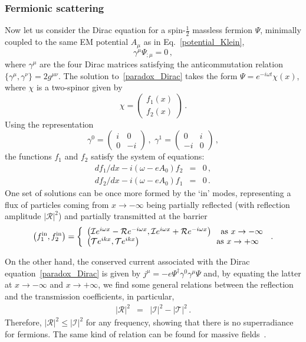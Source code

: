\documentclass[11pt]{article}
\newcommand{\be}{\begin{equation}}
\newcommand{\ee}{\end{equation}}
\newcommand{\bea}{\begin{eqnarray}}
\newcommand{\eea}{\end{eqnarray}}
\newcommand{\nn}{\nonumber}
\numberwithin{equation}{section} %
\begin{document}
\subsubsection{Fermionic scattering}
Now let us consider the Dirac equation for a spin-$\frac{1}{2}$ massless fermion $\Psi$, minimally coupled to the same 
EM potential $A_{\mu}$ as in Eq.~\eqref{potential_Klein},
%
\be\label{paradox_Dirac}
\gamma^{\mu}\Psi_{;\mu}=0\,,
\ee
%
where $\gamma^{\mu}$ are the four Dirac matrices satisfying the anticommutation relation $\{\gamma^{\mu},\gamma^{\nu}\}=2g^{\mu\nu}$. 
The solution to~\eqref{paradox_Dirac} takes the form $\Psi=e^{-i\omega t}\chi(x)$, where $\chi$ is a two-spinor given by
%
\be
\chi=\begin{pmatrix}f_1(x)\\f_2(x)\end{pmatrix}\,.
\ee
%
Using the representation
%
\be\label{rep}
\gamma^0=\begin{pmatrix}i&0\\0&-i\end{pmatrix}\,,\,\,\gamma^1=\begin{pmatrix}0&i\\-i&0\end{pmatrix}\,,
\ee
%
the functions $f_1$ and $f_2$ satisfy the system of equations:
%
\bea
df_1/dx-i(\omega-eA_0)f_2&=&0\,,\nn\\
df_2/dx-i(\omega-eA_0)f_1&=&0\,.
\eea
%
One set of solutions can be once more formed by the `in' modes, representing a flux of particles coming from $x\to-\infty$ being partially reflected (with reflection amplitude $|\mathcal{R}|^2$) and partially transmitted at the barrier
%
\bea\label{sol_fermion1}
\left(f_1^{\rm in},f_2^{\rm in}\right)=\left\{\begin{array}{l}
                                               \left(\mathcal{I}e^{i\omega x}-\mathcal{R} e^{-i\omega x},\mathcal{I} e^{i\omega x}+\mathcal{R} e^{-i\omega x}\right) \quad \text{as} \,\, x\to-\infty\\
                                               \left(\mathcal{T}e^{ikx},\mathcal{T}e^{ikx}\right) \quad \hspace{2.9cm} \text{as}\,\, x\to+\infty\
                                              \end{array}\right.\,.
\eea
%

On the other hand, the conserved current associated with the Dirac equation~\eqref{paradox_Dirac} is given by
$j^{\mu}=-e\Psi^{\dagger}\gamma^{0}\gamma^{\mu}\Psi$ and, by equating the latter at $x\to-\infty$ and $x\to+\infty$, we find some general relations between the reflection and the transmission coefficients, in particular, 
%
\bea\label{reflection_fermion}
\left|\mathcal{R}\right|^2&=&|\mathcal{I}|^2-\left|\mathcal{T}\right|^2\,.
\eea
%
Therefore, $\left|\mathcal{R}\right|^2\leq |\mathcal{I}|^2$ for any frequency, showing that there is no superradiance for fermions. The same kind of relation can be found for massive fields~\cite{Manogue1988}. 
\end{document}
